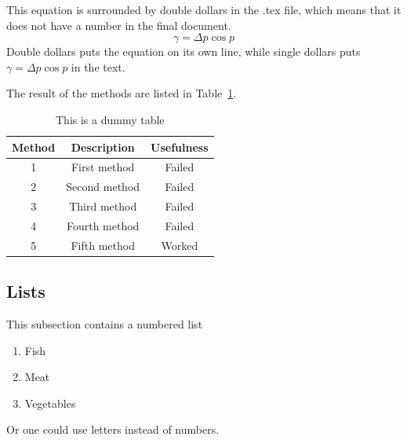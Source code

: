 \documentclass[twoside, fontsize=12pt,
     bibliography=totoc, %
     listof=totoc, %
     index=totoc, %
     onehalfspacing %
]{_MScDiss2017_cls}
\begin{document}
This equation is surrounded by double dollars in the .tex file, 
which means that it does not have a number in the final document. 
$$   
 \gamma = \Delta p \cos{ p }
$$
Double dollars puts the equation on its own line, while single 
dollars puts $\gamma = \Delta p \cos{ p }$ in the text. 

The result of the methods are listed in Table~\ref{tab:meth}. 
\begin{table}
 \begin{center}
 \begin{tabular}{|c|c|c|} \hline
 Method & Description & Usefulness \\ \hline
 1  &  First method  & Failed \\ \hline
 2  &  Second method & Failed \\ \hline
 3  &  Third method  & Failed \\ \hline
 4  &  Fourth method & Failed \\ \hline
 5  &  Fifth method  & Worked \\ \hline
 \end{tabular}
 \caption{This is a dummy table }
 \label{tab:meth}
 \end{center}
\end{table}

\subsection{Lists}
\label{subsec_list}
This subsection contains a numbered list
\begin{enumerate} 
 \item Fish
 \item Meat
 \item Vegetables
\end{enumerate}
Or one could use letters instead of numbers.

\begin{singlespace}%
    
\end{singlespace}
\end{document}
